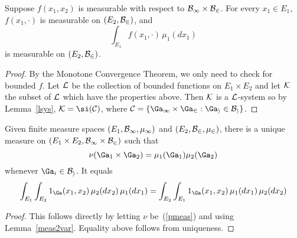 \begin{lem}\label{meas2var}
Suppose $f(x_1,x_2)$ is measurable with respect to $\cal B_1\times \cal B_2$. For every $x_1\in E_1$, $f(x_1,\cdot )$ is measurable on $(E_2,\cal B_2)$, and
\[
\int_{E_1} f(x_1,\cdot)\,\mu_1(dx_1)
\]
is measurable on $(E_2,\cal B_2)$.
\end{lem}
\begin{proof}
By the Monotone Convergence Theorem, we only need to check for bounded $f$. Let $\cal L$ be the collection of bounded functions on $E_1\times E_2$ and let $\cal K$ the subset of $\cal L$ which have the properties above. Then $\cal K$ is a $\cal L$-system so by Lemma~\ref{lsys}, $\cal K=\si(\cal C)$, where $\cal C=\{\Ga_1\times \Ga_2:\Ga_i\in \cal B_i\}$.
\end{proof}

\begin{thm}\label{prodmeas}
Given finite measure spaces $(E_1,\cal B_1,\mu_1)$ and $(E_2,\cal B_2, \mu_2)$, there is a unique measure on $(E_1\times E_2,\cal B_1\times \cal B_2)$ such that \[\nu(\Ga_1\times \Ga_2)=\mu_1(\Ga_1)\mu_2(\Ga_2)\]
whenever $\Ga_i\in \cal B_i$. It equals
\[
\int_{E_1}{\int_{E_2}1_{\Ga}(x_1,x_2)\,\mu_2(dx_2)}\,\mu_1(dx_1)
=
\int_{E_2}{\int_{E_1}1_{\Ga}(x_1,x_2)\,\mu_1(dx_1)}\,\mu_2(dx_2)
\]
\end{thm}
\begin{proof}
This follows directly by letting $\nu$ be~(\ref{pmeas}) and using Lemma~\ref{meas2var}. Equality above follows from uniqueness.
\end{proof}

